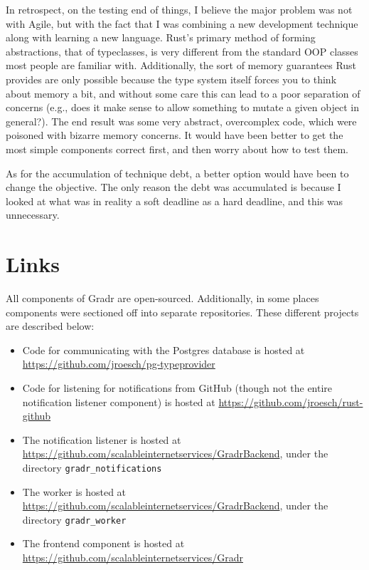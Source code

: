 \documentclass{scrartcl}
\begin{document}
In retrospect, on the testing end of things, I believe the major problem was not with Agile, but with the fact that I was combining a new development technique along with learning a new language.
Rust's primary method of forming abstractions, that of typeclasses, is very different from the standard OOP classes most people are familiar with.
Additionally, the sort of memory guarantees Rust provides are only possible because the type system itself forces you to think about memory a bit, and without some care this can lead to a poor separation of concerns (e.g., does it make sense to allow something to mutate a given object in general?).
The end result was some very abstract, overcomplex code, which were poisoned with bizarre memory concerns.
It would have been better to get the most simple components correct first, and then worry about how to test them.

As for the accumulation of technique debt, a better option would have been to change the objective.
The only reason the debt was accumulated is because I looked at what was in reality a soft deadline as a hard deadline, and this was unnecessary.

\section{Links}
All components of Gradr are open-sourced.
Additionally, in some places components were sectioned off into separate repositories.
These different projects are described below:

\begin{itemize}
  \item Code for communicating with the Postgres database is hosted at \url{https://github.com/jroesch/pg-typeprovider}

  \item Code for listening for notifications from GitHub (though not the entire notification listener component) is hosted at \url{https://github.com/jroesch/rust-github}

  \item The notification listener is hosted at \url{https://github.com/scalableinternetservices/GradrBackend}, under the directory \texttt{gradr\_notifications}

  \item The worker is hosted at \url{https://github.com/scalableinternetservices/GradrBackend}, under the directory \texttt{gradr\_worker}

  \item The frontend component is hosted at \url{https://github.com/scalableinternetservices/Gradr}
\end{itemize}

{}

\end{document}
